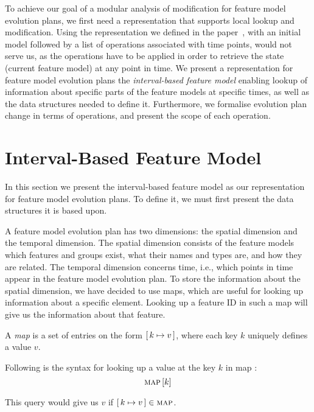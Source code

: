 To achieve our goal of a modular analysis of modification for feature model evolution plans, we first need a representation that supports local lookup and modification. Using the representation we defined in the paper~\cite{art:consistency-preserving-evolution-planning}, with an initial model followed by a list of operations associated with time points, would not serve us, as the operations have to be applied in order to retrieve the state (current feature model) at any point in time. We present a representation for feature model evolution plans \textemdash{} the \emph{interval-based feature model} \textemdash{} enabling lookup of information about specific parts of the feature models at specific times, as well as the data structures needed to define it. Furthermore, we formalise evolution plan change in terms of operations, and present the scope of each operation. 

\section{Interval-Based Feature Model}
\label{sec:interval-based-feature-model}
In this section we present the interval-based feature model as our representation for feature model evolution plans. To define it, we must first present the data structures it is based upon.

A feature model evolution plan has two dimensions: the spatial dimension and the temporal dimension. The spatial dimension consists of the feature models \textemdash{} which features and groups exist, what their names and types are, and how they are related. The temporal dimension concerns time, i.e., which points in time appear in the feature model evolution plan. To store the information about the spatial dimension, we have decided to use maps, which are useful for looking up information about a specific element. Looking up a feature ID in such a map will give us the information about that feature. 
\\

\begin{definition}[Map]
  A \emph{map} is a set of entries on the form $[ \,k \mapsto v\, ]$, where each key $k$ uniquely defines a value $v$. 
  \label{def:map}
\end{definition}

Following is the syntax for looking up a value at the key $k$ in map :
\[
  \textsc{map} \left[ k \right]
\]

This query would give us $v$ if $[ \,k \mapsto v\, ] \in \textsc{map}$.

